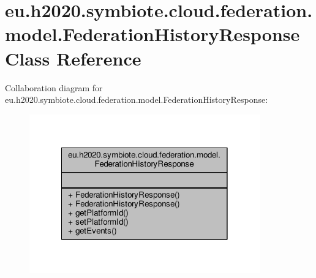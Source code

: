 \hypertarget{classeu_1_1h2020_1_1symbiote_1_1cloud_1_1federation_1_1model_1_1FederationHistoryResponse}{}\section{eu.\+h2020.\+symbiote.\+cloud.\+federation.\+model.\+Federation\+History\+Response Class Reference}
\label{classeu_1_1h2020_1_1symbiote_1_1cloud_1_1federation_1_1model_1_1FederationHistoryResponse}


Collaboration diagram for eu.\+h2020.\+symbiote.\+cloud.\+federation.\+model.\+Federation\+History\+Response\+:
\nopagebreak
\begin{figure}[H]
\begin{center}
\leavevmode
\includegraphics[width=282pt]{classeu_1_1h2020_1_1symbiote_1_1cloud_1_1federation_1_1model_1_1FederationHistoryResponse__coll__graph}
\end{center}
\end{figure}
